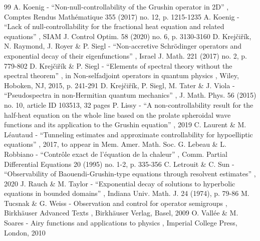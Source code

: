 \documentclass[11pt]{article}
\numberwithin{equation}{section}
\theoremstyle{plain}
\theoremstyle{definition}
\newcommand{\1}{\mathds 1}
\begin{document}
\begin{thebibliography}{99}
 A. Koenig - “Non-null-controllability of the Grushin operator in 2D” , Comptes Rendus Mathématique 355 (2017) no. 12, p. 1215-1235
 A. Koenig - “Lack of null-controllability for the fractional heat equation and related equations” , SIAM J. Control Optim. 58 (2020) no. 6, p. 3130-3160
 D. Krejčiřík, N. Raymond, J. Royer \& P. Siegl - “Non-accretive Schrödinger operators and exponential decay of their eigenfunctions” , Israel J. Math. 221 (2017) no. 2, p. 779-802
 D. Krejčiřík \& P. Siegl - “Elements of spectral theory without the spectral theorem” , in Non-selfadjoint operators in quantum physics , Wiley, Hoboken, NJ, 2015, p. 241-291
 D. Krejčiřík, P. Siegl, M. Tater \& J. Viola - “Pseudospectra in non-Hermitian quantum mechanics” , J. Math. Phys. 56 (2015) no. 10, article ID 103513, 32 pages
 P. Lissy - “A non-controllability result for the half-heat equation on the whole line based on the prolate spheroidal wave functions and its application to the Grushin equation” , 2019
 C. Laurent \& M. Léautaud - “Tunneling estimates and approximate controllability for hypoelliptic equations” , 2017, to appear in Mem. Amer. Math. Soc.
 G. Lebeau \& L. Robbiano - “Contrôle exact de l’équation de la chaleur” , Comm. Partial Differential Equations 20 (1995) no. 1-2, p. 335-356
 C. Letrouit \& C. Sun - “Observability of Baouendi-Grushin-type equations through resolvent estimates” , 2020
 J. Rauch \& M. Taylor - “Exponential decay of solutions to hyperbolic equations in bounded domains” , Indiana Univ. Math. J. 24 (1974), p. 79-86
 M. Tucsnak \& G. Weiss - Observation and control for operator semigroups , Birkhäuser Advanced Texts , Birkhäuser Verlag, Basel, 2009
 O. Vallée \& M. Soares - Airy functions and applications to physics , Imperial College Press, London, 2010
\end{thebibliography}
\end{document}
